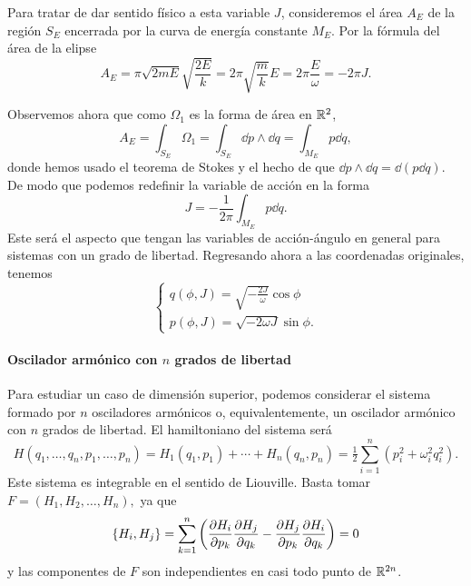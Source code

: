   Para tratar de dar sentido físico a esta variable $J$, consideremos el área $A_E$ de la región $S_E$ encerrada por la curva de energía constante $M_E$. Por la fórmula del área de la elipse
  \begin{equation*}
    A_E=\pi \sqrt{2mE} \sqrt{\frac{2E}{k}}=2\pi \sqrt{\frac{m}{k}} E= 2 \pi \frac{E}{\omega}= -2\pi J.
  \end{equation*}

  Observemos ahora que como $\Omega_1$ es la forma de área en $\mathbb{R}^2$, 
  \begin{equation*}
    A_E=\int_{S_E}\Omega_1 = \int_{S_E} \dd p \wedge \dd q = \int_{M_E}p\dd q,
\end{equation*}
donde hemos usado el teorema de Stokes y el hecho de que $\dd p \wedge \dd q= \dd(p\dd q)$. De modo que podemos redefinir la variable de acción en la forma
\begin{equation*}
  J=-\frac{1}{2\pi}\int_{M_E}p \dd q.
\end{equation*}
Este será el aspecto que tengan las variables de acción-ángulo en general para sistemas con un grado de libertad. Regresando ahora a las coordenadas originales, tenemos
\begin{equation*}
  \begin{cases}
    q(\phi,J)=\sqrt{-\frac{2J}{ \omega}}\cos \phi\\
    p(\phi,J)=\sqrt{-2\omega J}\sin \phi.
  \end{cases}
\end{equation*}

\paragraph{\bf Oscilador armónico con $n$ grados de libertad}\mbox{}

  Para estudiar un caso de dimensión superior, podemos considerar el sistema formado por $n$ osciladores armónicos o, equivalentemente, un oscilador armónico con $n$ grados de libertad. El hamiltoniano del sistema será 
  \begin{equation*}
    H(q_1,\dots,q_n,p_1,\dots,p_n)= H_1(q_1,p_1)+ \cdots +H_n(q_n,p_n) = \tfrac{1}{2}\sum_{i=1}^n (p_i^2+\omega_i^2q_i^2).
  \end{equation*}
  Este sistema es integrable en el sentido de Liouville. Basta tomar $F=(H_1,H_2,\dots,H_n),$ ya que 
  \begin{equation*}
    \left\lbrace H_i,H_j\right\rbrace = \sum_{k=1}^n\left( \frac{\partial H_i}{\partial p_k}\frac{\partial H_j}{\partial q_k} - \frac{\partial H_j}{\partial p_k}\frac{\partial H_i}{\partial q_k}\right)=0
  \end{equation*}
  y las componentes de $F$ son independientes en casi todo punto de $\mathbb{R}^{2n}$. 
  
